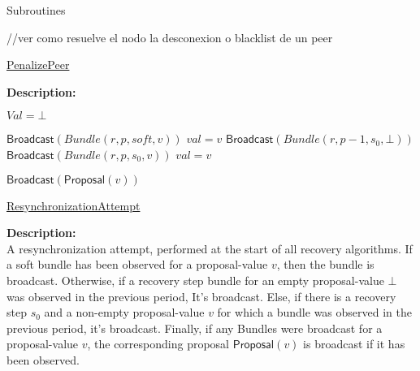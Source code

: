 \documentclass[10pt,a4paper]{article}
\begin{document}
\begin{section}{Subroutines}
\begin{algorithm}[H]\label{algo:penalize-peer}
    \begin{algorithmic}[1]
        //ver como resuelve el nodo la desconexion o blacklist de un peer
    \EndFunction
    \end{algorithmic}
    \caption{\underline{PenalizePeer}}
\end{algorithm}

\noindent \textbf{Description:}\\


\begin{algorithm}[H]\label{algo:resynchronization-attempt}
    \begin{algorithmic}[1]


    \State $Val = \bot$

        \State $\mathsf{Broadcast}(Bundle(r, p, soft, v))$
        \State $val = v$    
        \State $\mathsf{Broadcast}(Bundle(r, p - 1, s_0, \bot))$
        \State $\mathsf{Broadcast}(Bundle(r, p, s_0, v))$
        \State $val = v$
    \EndIf

        \State $\mathsf{Broadcast}(\mathsf{Proposal}(v))$
    \EndIf

    \EndFunction
    \end{algorithmic}
    \caption{\underline{ResynchronizationAttempt}}
\end{algorithm}

\noindent \textbf{Description:}\\
A resynchronization attempt, performed at the start of all recovery algorithms.
If a soft bundle has been observed for a proposal-value $v$, then the bundle is broadcast.
Otherwise, if a recovery step bundle for an empty proposal-value $\bot$ was observed in the previous period,
It's broadcast.
Else, if there is a recovery step $s_0$ and a non-empty proposal-value $v$ for which a bundle was observed in the previous
period, it's broadcast.
Finally, if any Bundles were broadcast for a proposal-value $v$, the corresponding proposal $\mathsf{Proposal}(v)$ is broadcast
if it has been observed.


\end{section}
\end{document}
